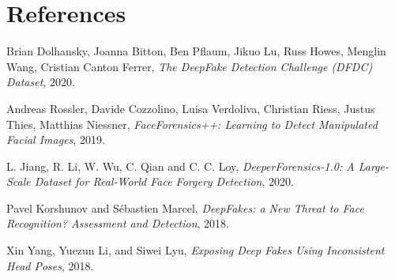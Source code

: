 \documentclass{article}
\begin{document}
\section*{References}
\begin{thebibliography}{9}
    Brian Dolhansky, Joanna Bitton, Ben Pflaum, Jikuo Lu, Russ Howes, Menglin Wang, Cristian Canton Ferrer, 
    \emph{The DeepFake Detection Challenge (DFDC) Dataset}, 
    2020.

    Andreas Rossler, Davide Cozzolino, Luisa Verdoliva, Christian Riess, Justus Thies, Matthias Niessner, 
    \emph{FaceForensics++: Learning to Detect Manipulated Facial Images}, 
    2019.

    L. Jiang, R. Li, W. Wu, C. Qian and C. C. Loy, 
    \emph{DeeperForensics-1.0: A Large-Scale Dataset for Real-World Face Forgery Detection}, 
    2020.

    Pavel Korshunov and S{\'{e}}bastien Marcel, 
    \emph{DeepFakes: a New Threat to Face Recognition? Assessment and Detection}, 
    2018.

    Xin Yang, Yuezun Li, and Siwei Lyu,
    \emph{Exposing Deep Fakes Using Inconsistent Head Poses}, 
    2018.
\end{thebibliography}
\end{document}

